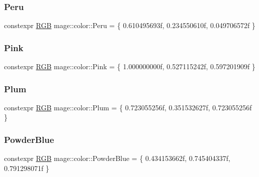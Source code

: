 \mbox{\label{namespacemage_1_1color_a6fada3c18d633306e50b65df7bf6c043}} 
\subsubsection{\texorpdfstring{Peru}{Peru}}
{\footnotesize\ttfamily constexpr \mbox{\hyperlink{structmage_1_1_r_g_b}{R\+GB}} mage\+::color\+::\+Peru = \{ 0.\+610495693f, 0.\+234550610f, 0.\+049706572f \}}

\mbox{\label{namespacemage_1_1color_ae16637717be4ec8fdf6991f24e5ccf27}} 
\subsubsection{\texorpdfstring{Pink}{Pink}}
{\footnotesize\ttfamily constexpr \mbox{\hyperlink{structmage_1_1_r_g_b}{R\+GB}} mage\+::color\+::\+Pink = \{ 1.\+000000000f, 0.\+527115242f, 0.\+597201909f \}}

\mbox{\label{namespacemage_1_1color_aa46d4f06d75baccba40c0b04ddb88775}} 
\subsubsection{\texorpdfstring{Plum}{Plum}}
{\footnotesize\ttfamily constexpr \mbox{\hyperlink{structmage_1_1_r_g_b}{R\+GB}} mage\+::color\+::\+Plum = \{ 0.\+723055256f, 0.\+351532627f, 0.\+723055256f \}}

\mbox{\label{namespacemage_1_1color_aa958d1e0bc2c4f67cdd4e74552d63600}} 
\subsubsection{\texorpdfstring{Powder\+Blue}{PowderBlue}}
{\footnotesize\ttfamily constexpr \mbox{\hyperlink{structmage_1_1_r_g_b}{R\+GB}} mage\+::color\+::\+Powder\+Blue = \{ 0.\+434153662f, 0.\+745404337f, 0.\+791298071f \}}

